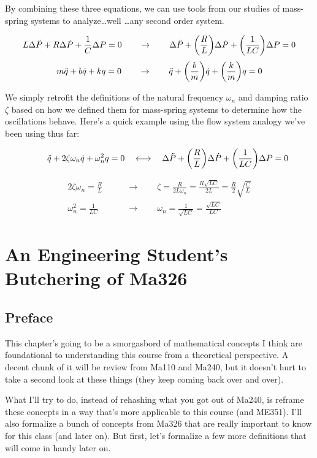 \documentclass{report}
\begin{document}
\begin{onehalfspacing}
\begin{flushleft}
By combining these three equations, we can use tools from our studies of mass-spring systems to analyze\dots well \dots any second order system.

\vspace{-0.1in}
\[L \Delta \ddot{P} + R \Delta \dot{P} + \frac{1}{C} \Delta P = 0 \qquad \to \qquad \Delta \ddot{P} + \qty(\frac{R}{L}) \Delta \dot{P} + \qty(\frac{1}{LC}) \Delta P = 0\]
\[m \ddot{q} + b \dot{q} + k q = 0 \qquad \to \qquad \ddot{q} + \qty(\frac{b}{m}) \dot{q} + \qty(\frac{k}{m}) q = 0\]

We simply retrofit the definitions of the natural frequency \(\omega_n\) and damping ratio \(\zeta\) based on how we defined them for mass-spring systems to determine how the oscillations behave. Here's a quick example using the flow system analogy we've been using thus far:

\vspace{-0.1in}
\[\qquad \ddot{q} + 2\zeta\omega_n \dot{q} + \omega_n^2 q = 0 \quad \longleftrightarrow \quad  \Delta \ddot{P} + \qty(\frac{R}{L}) \Delta \dot{P} + \qty(\frac{1}{LC}) \Delta P = 0\]

\vspace{-0.25in}
\begin{align*}
    2 \zeta \omega_n = \frac{R}{L} \qquad &\longrightarrow \qquad \zeta = \frac{R}{2L \omega_n} = \frac{R\sqrt{LC}}{2L} = \frac{R}{2} \sqrt{\frac{C}{L}}\\
    \omega_n^2 = \frac{1}{LC} \qquad &\longrightarrow \qquad \omega_n = \frac{1}{\sqrt{LC}} = \frac{\sqrt{LC}}{LC}
\end{align*}

\chapter{An Engineering Student's Butchering of Ma326}

\section*{Preface}

This chapter's going to be a smorgasbord of mathematical concepts I think are foundational to understanding this course from a theoretical perspective. A decent chunk of it will be review from Ma110 and Ma240, but it doesn't hurt to take a second look at these things (they keep coming back over and over).

\medskip

What I'll try to do, instead of rehashing what you got out of Ma240, is reframe these concepts in a way that's more applicable to this course (and ME351). I'll also formalize a bunch of concepts from Ma326 that are really important to know for this class (and later on). But first, let's formalize a few more definitions that will come in handy later on.


\end{flushleft}
\end{onehalfspacing}
\end{document}
